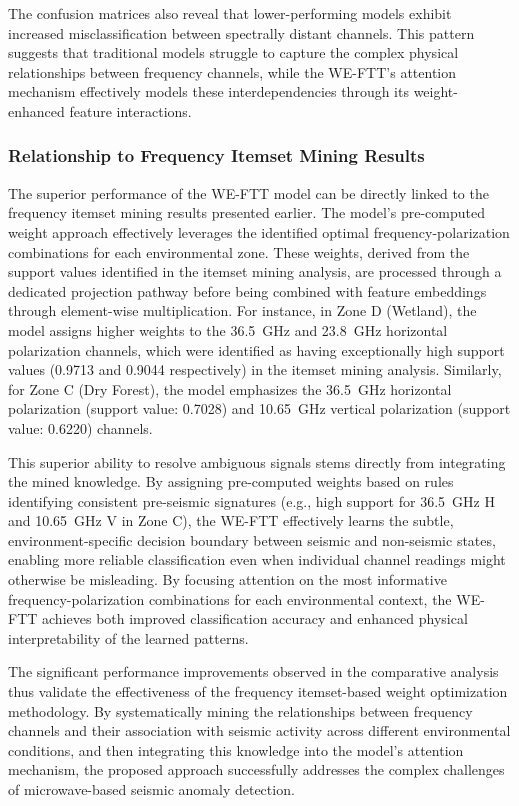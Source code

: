 \documentclass[preprint,review,12pt,authoryear]{elsarticle}
\begin{document}
The confusion matrices also reveal that lower-performing models exhibit increased misclassification between spectrally distant channels. This pattern suggests that traditional models struggle to capture the complex physical relationships between frequency channels, while the WE-FTT's attention mechanism effectively models these interdependencies through its weight-enhanced feature interactions.

\subsubsection{Relationship to Frequency Itemset Mining Results}
The superior performance of the WE-FTT model can be directly linked to the frequency itemset mining results presented earlier. The model's pre-computed weight approach effectively leverages the identified optimal frequency-polarization combinations for each environmental zone. These weights, derived from the support values identified in the itemset mining analysis, are processed through a dedicated projection pathway before being combined with feature embeddings through element-wise multiplication. For instance, in Zone D (Wetland), the model assigns higher weights to the 36.5~GHz and 23.8~GHz horizontal polarization channels, which were identified as having exceptionally high support values (0.9713 and 0.9044 respectively) in the itemset mining analysis. Similarly, for Zone C (Dry Forest), the model emphasizes the 36.5~GHz horizontal polarization (support value: 0.7028) and 10.65~GHz vertical polarization (support value: 0.6220) channels.

This superior ability to resolve ambiguous signals stems directly from integrating the mined knowledge. By assigning pre-computed weights based on rules identifying consistent pre-seismic signatures (e.g., high support for 36.5~GHz H and 10.65~GHz V in Zone C), the WE-FTT effectively learns the subtle, environment-specific decision boundary between seismic and non-seismic states, enabling more reliable classification even when individual channel readings might otherwise be misleading. By focusing attention on the most informative frequency-polarization combinations for each environmental context, the WE-FTT achieves both improved classification accuracy and enhanced physical interpretability of the learned patterns.

The significant performance improvements observed in the comparative analysis thus validate the effectiveness of the frequency itemset-based weight optimization methodology. By systematically mining the relationships between frequency channels and their association with seismic activity across different environmental conditions, and then integrating this knowledge into the model's attention mechanism, the proposed approach successfully addresses the complex challenges of microwave-based seismic anomaly detection.
\end{document}
